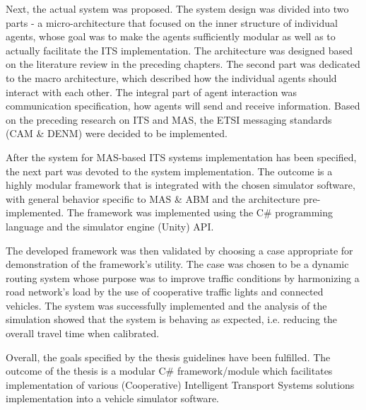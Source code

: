 \documentclass[titlepage, 12pt]{article}
\begin{document}
Next, the actual system was proposed. The system design was divided into two parts - a
micro-architecture that focused on the inner structure of individual agents, whose goal was to
make the agents sufficiently modular as well as to actually facilitate the ITS implementation.
The architecture was designed based on the literature review in the preceding chapters. The
second part was dedicated to the macro architecture, which described how the individual agents
should interact with each other. The integral part of agent interaction was communication
specification, how agents will send and receive information.  Based on the preceding research
on ITS and MAS, the ETSI messaging standards (CAM \& DENM) were decided to be implemented.

After the system for MAS-based ITS systems implementation has been specified, the next part was
devoted to the system implementation.  The outcome is a highly modular framework that is
integrated with the chosen simulator software, with general behavior specific to MAS \& ABM 
and the architecture pre-implemented. The framework was implemented using the C\# programming 
language and the simulator engine (Unity) API. 

The developed framework was then validated by choosing a case appropriate for demonstration of the 
framework's utility. The case was chosen to be a dynamic routing system whose purpose was to 
improve traffic conditions by harmonizing a road network's load by the use of cooperative 
traffic lights and connected vehicles. The system was successfully implemented and the analysis of the 
simulation showed that the system is behaving as expected, i.e. reducing the overall travel time when 
calibrated.

Overall, the goals specified by the thesis guidelines have been fulfilled. The outcome of the thesis is a 
modular C\# framework/module which facilitates implementation of various (Cooperative) 
Intelligent Transport Systems solutions implementation into a vehicle simulator software. 

\clearpage

\thispagestyle{empty}

\clearpage

\printbibliography
\end{document}
